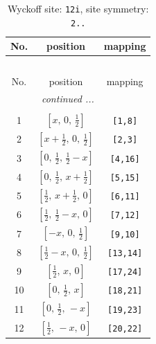 \documentclass[fleqn,8pt]{jsarticle}
\begin{document}
\begin{longtable}{ccc}
\caption{Wyckoff site: {\tt 12i}, site symmetry: {\tt 2..}}
 \\
 \hline \hline
No. & position & mapping \\ \hline \endfirsthead

\multicolumn{2}{l}{\tablename\ \thetable{}} \\
 \hline \hline
No. & position & mapping \\ \hline \endhead

 \hline \hline
\multicolumn{2}{r}{\footnotesize\it continued ...} \\ \endfoot

 \hline \hline
\multicolumn{2}{r}{} \\ \endlastfoot

1 & $\left[ x,\, 0,\, \frac{1}{2} \right]$ & {\tt [1,8]} \\ \hline
2 & $\left[ x + \frac{1}{2},\, 0,\, \frac{1}{2} \right]$ & {\tt [2,3]} \\ \hline
3 & $\left[ 0,\, \frac{1}{2},\, \frac{1}{2} - x \right]$ & {\tt [4,16]} \\ \hline
4 & $\left[ 0,\, \frac{1}{2},\, x + \frac{1}{2} \right]$ & {\tt [5,15]} \\ \hline
5 & $\left[ \frac{1}{2},\, x + \frac{1}{2},\, 0 \right]$ & {\tt [6,11]} \\ \hline
6 & $\left[ \frac{1}{2},\, \frac{1}{2} - x,\, 0 \right]$ & {\tt [7,12]} \\ \hline
7 & $\left[ - x,\, 0,\, \frac{1}{2} \right]$ & {\tt [9,10]} \\ \hline
8 & $\left[ \frac{1}{2} - x,\, 0,\, \frac{1}{2} \right]$ & {\tt [13,14]} \\ \hline
9 & $\left[ \frac{1}{2},\, x,\, 0 \right]$ & {\tt [17,24]} \\ \hline
10 & $\left[ 0,\, \frac{1}{2},\, x \right]$ & {\tt [18,21]} \\ \hline
11 & $\left[ 0,\, \frac{1}{2},\, - x \right]$ & {\tt [19,23]} \\ \hline
12 & $\left[ \frac{1}{2},\, - x,\, 0 \right]$ & {\tt [20,22]} \\
\end{longtable}
\renewcommand{\arraystretch}{1.2}
\end{document}
